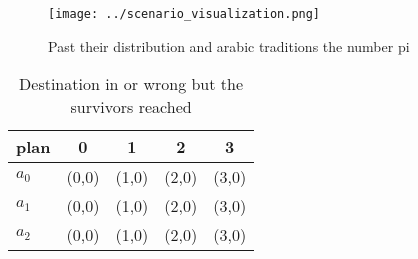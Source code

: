 \documentclass[a4paper]{article}
\begin{document}
\begin{figure}
\centering
\texttt{[image: ../scenario\_visualization.png]}
\caption{Past their distribution and arabic traditions the number pi
}
\end{figure}
 
\begin{table}
\begin{adjustbox}{width=0.6\columnwidth}
\begin{tabular}{|l|l|l|l|l|}
\hline
\textbf{plan} & \multicolumn{1}{c|}{\textbf{0}} & \multicolumn{1}{c|}{\textbf{1}} & \multicolumn{1}{c|}{\textbf{2}} & \multicolumn{1}{c|}{\textbf{3}} \\ \hline
\textbf{$a_0$}  & (0,0) & (1,0) & (2,0) & (3,0) \\ \hline
\textbf{$a_1$}  & (0,0) & (1,0) & (2,0) & (3,0) \\ \hline
\textbf{$a_2$}  & (0,0) & (1,0) & (2,0) & (3,0) \\ \hline
\end{tabular}
\end{adjustbox}
\caption{Destination in or wrong but the survivors reached
}
\end{table}
\end{document}

